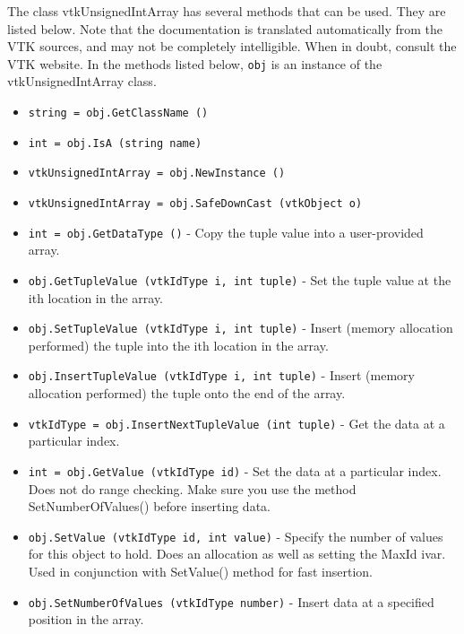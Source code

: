 The class vtkUnsignedIntArray has several methods that can be used.
  They are listed below.
Note that the documentation is translated automatically from the VTK sources,
and may not be completely intelligible.  When in doubt, consult the VTK website.
In the methods listed below, \verb|obj| is an instance of the vtkUnsignedIntArray class.
\begin{itemize}
\item  \verb|string = obj.GetClassName ()|

\item  \verb|int = obj.IsA (string name)|

\item  \verb|vtkUnsignedIntArray = obj.NewInstance ()|

\item  \verb|vtkUnsignedIntArray = obj.SafeDownCast (vtkObject o)|

\item  \verb|int = obj.GetDataType ()| -  Copy the tuple value into a user-provided array.

\item  \verb|obj.GetTupleValue (vtkIdType i, int tuple)| -  Set the tuple value at the ith location in the array.

\item  \verb|obj.SetTupleValue (vtkIdType i, int tuple)| -  Insert (memory allocation performed) the tuple into the ith location
 in the array.

\item  \verb|obj.InsertTupleValue (vtkIdType i, int tuple)| -  Insert (memory allocation performed) the tuple onto the end of the array.

\item  \verb|vtkIdType = obj.InsertNextTupleValue (int tuple)| -  Get the data at a particular index.

\item  \verb|int = obj.GetValue (vtkIdType id)| -  Set the data at a particular index. Does not do range checking. Make sure
 you use the method SetNumberOfValues() before inserting data.

\item  \verb|obj.SetValue (vtkIdType id, int value)| -  Specify the number of values for this object to hold. Does an
 allocation as well as setting the MaxId ivar. Used in conjunction with
 SetValue() method for fast insertion.

\item  \verb|obj.SetNumberOfValues (vtkIdType number)| -  Insert data at a specified position in the array.


\end{itemize}
